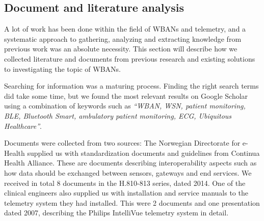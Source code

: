 
\subsection{Document and literature analysis} %
\label{sub:document_and_literature_analysis}

A lot of work has been done within the field of WBANs and telemetry, and a systematic approach to gathering, analyzing and extracting knowledge from previous work was an absolute necessity. This section will describe how we collected literature and documents from previous research and existing solutions to investigating the topic of WBANs.

Searching for information was a maturing process. Finding the right search terms did take some time, but we found the most relevant results on Google Scholar using a combination of keywords such as \textit{``WBAN, WSN, patient monitoring, BLE, Bluetooth Smart, ambulatory patient monitoring, ECG, Ubiquitous Healthcare''}.

Documents were collected from two sources: The Norwegian Directorate for e-Health supplied us with standardization documents and guidelines from Continua Health Alliance. These are documents describing interoperability aspects such as how data should be exchanged between sensors, gateways and end services. We received in total 8 documents in the H.810-813 series, dated 2014. One of the clinical engineers also supplied us with installation and service manuals to the telemetry system they had installed. This were 2 documents and one presentation dated 2007, describing the Philips IntelliVue telemetry system in detail.


